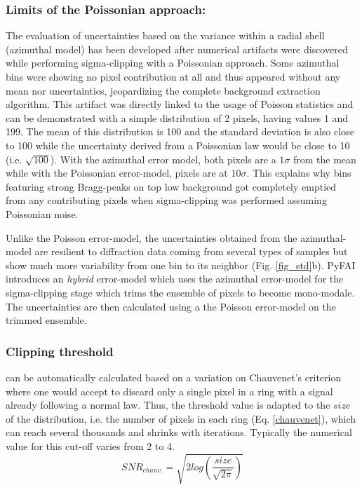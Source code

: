 \documentclass[preprint]{iucr}              %
\begin{document}
\subsubsection{Limits of the Poissonian approach:}

The evaluation of uncertainties based on the variance within a radial shell (azimuthal model) has been developed after numerical artifacts were discovered while performing sigma-clipping with a Poissonian approach. 
Some azimuthal bins were showing no pixel contribution at all and thus appeared without any mean nor uncertainties, jeopardizing the complete background extraction algorithm. 
This artifact was directly linked to the usage of Poisson statistics and can be demonstrated with a simple distribution of 2 pixels, having values 1 and 199. 
The mean of this distribution is 100 and the standard deviation is also close to 100 while the uncertainty derived from a Poissonian law would  be close to 10 (i.e. $\sqrt{100}$). 
With the azimuthal error model, both pixels are a $1\sigma$ from the mean while with the Poissonian error-model, pixels are at $10 \sigma$.  
This explains why bins featuring strong Bragg-peaks on top low background got completely emptied from any contributing pixels when sigma-clipping was performed assuming Poissonian noise.

Unlike the Poisson error-model, the uncertainties obtained from the azimuthal-model are resilient to diffraction data coming from several types of samples but show much more variability from one bin to its neighbor (Fig. \ref{fig_std}b). 
PyFAI introduces an \textit{hybrid} error-model which uses the azimuthal error-model for the sigma-clipping stage which trims the ensemble of pixels to become mono-modale.
The uncertainties are then calculated using a the Poisson error-model on the trimmed ensemble.

\subsubsection{Clipping threshold}
can be automatically calculated based on a variation on Chauvenet's criterion \cite{chauvenet} where one would accept to discard only a single pixel in a ring with a signal already following a normal law. 
Thus, the threshold value is adapted to the $size$ of the distribution, i.e. the number of pixels in each ring (Eq. \ref{chauvenet}), which can reach several thousands and shrinks with iterations.
Typically the numerical value for this cut-off varies from 2 to 4.   
\begin{equation}
\label{chauvenet}
SNR_{chauv.} =  \sqrt{2 log(\frac{size}{\sqrt{2 \pi}})}
\end{equation}
\end{document}
